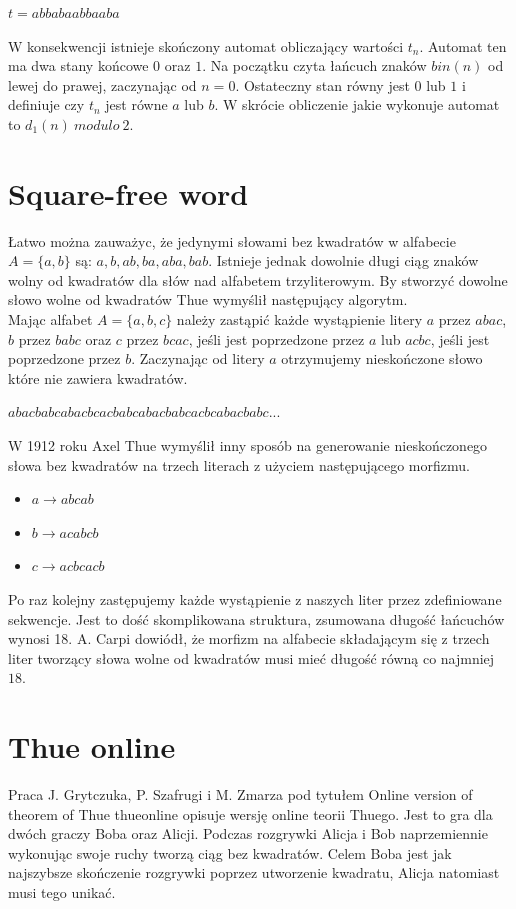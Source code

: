 \documentclass[document]{xmgr}
\begin{document}
{\centering $t = abbabaabbaaba$ \par}

W konsekwencji istnieje skończony automat obliczający wartości $t_n$. Automat ten ma dwa stany końcowe $0$ oraz $1$. Na początku czyta łańcuch znaków $bin(n)$ od lewej do prawej, zaczynając od $n = 0$. Ostateczny stan równy jest $0$ lub $1$ i definiuje czy $t_n$ jest równe $a$ lub $b$. W skrócie obliczenie jakie wykonuje automat to $d_1(n)\ modulo\ 2$.


\section{Square-free word}
Łatwo można zauważyc, że jedynymi słowami bez kwadratów w alfabecie $A = \{a, b\}$ są: $a, b, ab, ba, aba, bab$. Istnieje jednak dowolnie długi ciąg znaków wolny od kwadratów dla słów nad alfabetem trzyliterowym. By stworzyć dowolne słowo wolne od kwadratów Thue wymyślił następujący algorytm.\\
Mając alfabet $A = \{a, b, c\}$ należy zastąpić każde wystąpienie litery $a$ przez $abac$,  $b$ przez $babc$ oraz $c$ przez $bcac$, jeśli jest poprzedzone przez $a$ lub $acbc$, jeśli jest poprzedzone przez $b$. Zaczynając od litery $a$ otrzymujemy nieskończone słowo które nie zawiera kwadratów.

{\centering $abacbabcabacbcacbabcabacbabcacbcabacbabc...$ \par}

W 1912 roku Axel Thue wymyślił inny sposób na generowanie nieskończonego słowa bez kwadratów na trzech literach z użyciem następującego morfizmu. 
\begin{itemize}
\item $a \to abcab$
\item $b \to acabcb$
\item $c \to acbcacb$
\end{itemize}


Po raz kolejny zastępujemy każde wystąpienie z naszych liter przez zdefiniowane sekwencje. Jest to dość skomplikowana struktura, zsumowana długość łańcuchów wynosi 18. A. Carpi \cite{carpi} dowiódł, że morfizm na alfabecie składającym się z trzech liter tworzący słowa wolne od kwadratów musi mieć długość równą co najmniej $18$.

\section{Thue online}
Praca J. Grytczuka, P. Szafrugi i M. Zmarza pod tytułem Online version of theorem of Thue {thueonline} opisuje wersję online teorii Thuego. Jest to gra dla dwóch graczy Boba oraz Alicji. Podczas rozgrywki Alicja i Bob naprzemiennie wykonując swoje ruchy tworzą ciąg bez kwadratów. Celem Boba jest jak najszybsze skończenie rozgrywki poprzez utworzenie kwadratu, Alicja natomiast musi tego unikać.
\end{document}
